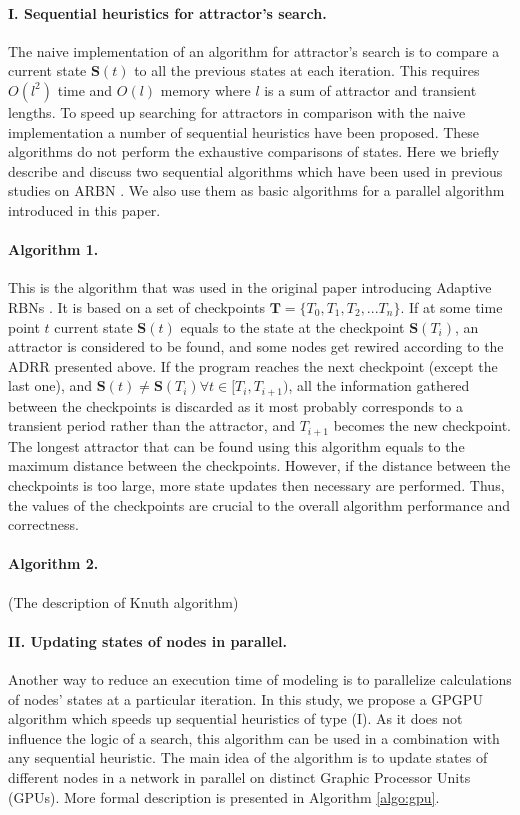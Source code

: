 \documentclass[procedia]{easychair}
\begin{document}
	\paragraph{I. Sequential heuristics for attractor's search.} The naive implementation of an algorithm for attractor's search is to compare a current state $\mathbf{S}(t)$ to all the previous states at each iteration. This requires $O(l^2)$ time and $O(l)$ memory where $l$ is a sum of attractor and transient lengths. 	
	To speed up searching for attractors in comparison with the naive implementation a number of sequential heuristics have been proposed. These algorithms do not perform the exhaustive comparisons of states. Here we briefly describe and discuss two sequential algorithms which have been used in previous studies on ARBN \cite{mlb,Gorski2016}. We also use them as basic algorithms for a parallel algorithm introduced in this paper.
	
	\paragraph{Algorithm 1.} This is the algorithm that was used in the original paper introducing Adaptive RBNs \cite{mlb}.  It is based on a set of checkpoints $\mathbf{T} = \{T_0, T_1, T_2, ... T_n\}$. If at some time point $t$ current state $\mathbf{S}(t)$ equals to the state at the checkpoint $\mathbf{S}(T_i)$, an attractor is considered to be found, and some nodes get rewired according to the ADRR presented above. If the program reaches the next checkpoint (except the last one), and $\mathbf{S}(t) \neq \mathbf{S}(T_i) \forall t \in [T_i, T_{i+1})$, all the information gathered between the checkpoints is discarded as it most probably corresponds to a transient period rather than the attractor, and $T_{i+1}$ becomes the new checkpoint. The longest attractor that can be found using this algorithm equals to the maximum distance between the checkpoints. However, if the distance between the checkpoints is too large, more state updates then necessary are performed. Thus, the values of the checkpoints are crucial to the overall algorithm performance and correctness.
	 
	\paragraph{Algorithm 2.} (The description of Knuth algorithm)

	\paragraph{II. Updating states of nodes in parallel.} Another way to reduce an execution time of modeling is to parallelize calculations of nodes' states at a particular iteration. In this study, we propose a GPGPU algorithm which speeds up sequential heuristics of type (I). As it does not influence the logic of a search, this algorithm can be used in a combination with any sequential heuristic. The main idea of the algorithm is to update states of different nodes in a network in parallel on distinct Graphic Processor Units (GPUs). More formal description is presented in Algorithm \ref{algo:gpu}.
\end{document}
